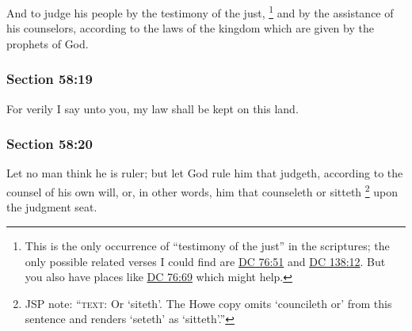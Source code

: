 		And to judge his people by the testimony of the just,%
			\footnote{%
				This is the only occurrence of ``testimony of the just'' in the scriptures; the only possible related verses I could find are \hyperref[DC76-51]{DC 76:51} and \hyperref[DC138-12]{DC 138:12}. But you also have places like \hyperref[DC76-69]{DC 76:69} which might help.
				} 
		and by the assistance of his counselors, according to the laws of the kingdom which are given by the prophets of God.


	\subsubsection{Section 58:19} %
		\label{DC58-19}

		For verily I say unto you, my law shall be kept on this land.


	\subsubsection{Section 58:20} %
		\label{DC58-20}

		Let no man think he is ruler; but let God rule him that judgeth, according to the counsel of his own will, or, in other words, him that counseleth or sitteth%
			\footnote{%
				JSP note: ``\textsc{text}: Or `siteth'. The Howe copy omits `councileth or' from this sentence and renders `seteth' as `sitteth'.''
				}
		upon the judgment seat.



